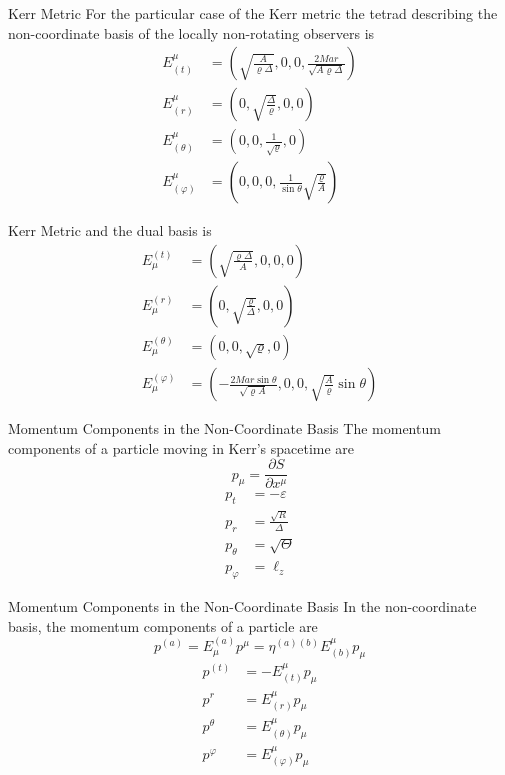 \documentclass{beamer}
\begin{document}
\begin{darkframes}
\begin{frame}{Kerr Metric}
	For the particular case of the Kerr metric the tetrad describing 	the non-coordinate basis of the locally non-rotating observers is
	\begin{align*}
	E^\mu _{(t)} &= \left( \sqrt{\frac{A}{\varrho \Delta}}, 0, 0, \frac{2Mar}{\sqrt{A \varrho \Delta}} \right)\\
	E^\mu _{(r)} &= \left( 0, \sqrt{\frac{\Delta}{\varrho}}, 0, 0 \right)\\
	E^\mu _{(\theta )} &= \left( 0, 0, \frac{1}{\sqrt{\varrho}}, 0 \right)\\
	E^\mu _{(\varphi )} &= \left( 0, 0, 0, \frac{1}{\sin \theta}\sqrt{\frac{\varrho}{A}} \right)
	\end{align*}
\end{frame}

\begin{frame}{Kerr Metric}
	and the dual basis is
	\begin{align*}
	E_\mu ^{(t)} &= \left( \sqrt{\frac{\varrho \Delta}{A}}, 0, 0, 0 \right)\\
	E_\mu ^{(r)} &= \left( 0, \sqrt{\frac{\varrho}{\Delta}}, 0, 0 \right)\\
	E_\mu ^{(\theta )} &= \left( 0, 0, \sqrt{\varrho}, 0 \right)\\
	E_\mu ^{(\varphi )} &= \left( -\frac{2Mar \sin \theta}{\sqrt{\varrho A}}, 0, 0, \sqrt{\frac{A}{\varrho}} \sin \theta \right)
	\end{align*}
\end{frame}

\begin{frame}{Momentum Components in the Non-Coordinate Basis}
	The momentum components of a particle moving in Kerr's spacetime are
	\[ p_\mu = \frac{\partial S}{\partial x^\mu} \]
	\pause
	\begin{align*}
	p_t &= -\varepsilon\\
	p_r &= \frac{\sqrt{R}}{\Delta}\\
	p_\theta &= \sqrt{\Theta}\\
	p_\varphi &= \ell_z
	\end{align*}
\end{frame}

\begin{frame}{Momentum Components in the Non-Coordinate Basis}
	In the non-coordinate basis, the momentum components of a particle are
	\[ p^{(a)} = E^{(a)}_\mu p^\mu = \eta ^{(a)(b)} E_{(b)}^\mu p_\mu  \]
	\pause
	\begin{align*}
	p^(t) &= -E_{(t)}^\mu p_\mu\\
	p^r &= E_{(r)}^\mu p_\mu\\
	p^\theta &= E_{(\theta)}^\mu p_\mu\\
	p^\varphi &= E_{(\varphi)}^\mu p_\mu
	\end{align*}
\end{frame}


\end{darkframes}
\end{document}
